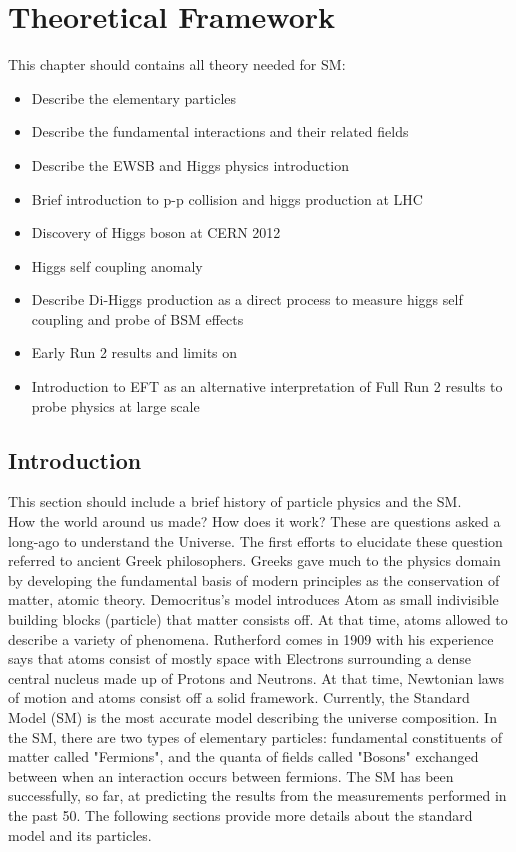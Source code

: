 \newpage
\chapter{Theoretical Framework}
\label{chap1}

This chapter should contains all theory needed for SM:
\begin{itemize}
    \item Describe the elementary particles 
    \item Describe the fundamental interactions and their related fields
    \item Describe the EWSB and Higgs physics introduction
    \item Brief introduction to p-p collision and higgs production at LHC
    \item Discovery of Higgs boson at CERN 2012
    \item Higgs self coupling anomaly
    \item Describe Di-Higgs production as a direct process to measure higgs self coupling and probe of BSM effects
    \item Early Run 2 results and limits on \kl
    \item Introduction to EFT as an alternative interpretation of Full Run 2 results to probe physics at large scale 
\end{itemize}

\section{Introduction}
\label{chap1:intro}

This section should include a brief history of particle physics and the SM. \\

How the world around us made? How does it work? These are questions asked a long-ago to understand the Universe. The first efforts to elucidate these question referred to ancient Greek philosophers. Greeks gave much to the physics domain by developing the fundamental basis of modern principles as the conservation of matter, atomic theory. Democritus's model introduces Atom as small indivisible building blocks (particle) that matter consists off. At that time, atoms allowed to describe a variety of phenomena. Rutherford comes in 1909 with his experience says that atoms consist of mostly space with Electrons surrounding a dense central nucleus made up of Protons and Neutrons. At that time, Newtonian laws of motion and atoms consist off a solid framework. Currently, the Standard Model (SM) is the most accurate model describing the universe composition. In the SM, there are two types of elementary particles: fundamental constituents of matter called "Fermions", and the quanta of fields called "Bosons" exchanged between when an interaction occurs between fermions. The SM has been successfully, so far, at predicting the results from the measurements performed in the past 50. The following sections provide more details about the standard model and its particles.


